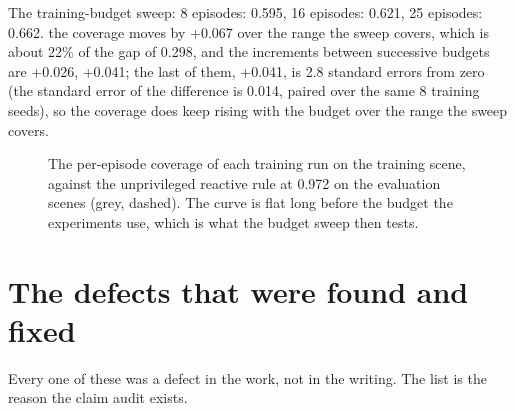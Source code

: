 \documentclass[11pt,a4paper]{article}
\begin{document}
The training-budget sweep: 8 episodes: 0.595, 16 episodes: 0.621, 25 episodes: 0.662. the coverage moves by +0.067 over the range the sweep covers, which is about 22\% of the gap of 0.298, and the increments between successive budgets are +0.026, +0.041; the last of them, +0.041, is 2.8 standard errors from zero (the standard error of the difference is 0.014, paired over the same 8 training seeds), so the coverage does keep rising with the budget over the range the sweep covers.

\begin{figure}[t]
\centering
\resizebox{0.72\linewidth}{!}{%
\begin{minipage}{3.5in}

\end{minipage}}
\caption{The per-episode coverage of each training run on the training scene, against the unprivileged reactive rule at 0.972 on the evaluation scenes (grey, dashed).  The curve is flat long before the budget the experiments use, which is what the budget sweep then tests.}
\label{fig:report-curve}
\end{figure}

\section{The defects that were found and fixed}
Every one of these was a defect in the work, not in the writing. The list is the reason the claim audit exists.
\end{document}
